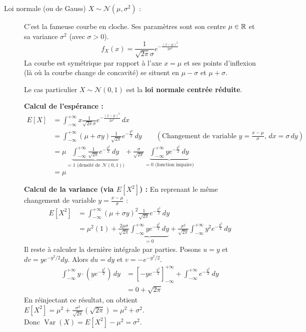 \begin{description}
    \item[Loi normale (ou de Gauss) $X \sim \mathcal{N}(\mu, \sigma^2)$ :]
    C'est la fameuse courbe en cloche. Ses paramètres sont son centre $\mu \in \mathbb{R}$ et sa variance $\sigma^2$ (avec $\sigma > 0$).
    \[
    f_X(x) = \frac{1}{\sqrt{2\pi}\sigma} e^{-\frac{(x-\mu)^2}{2\sigma^2}}
    \]
    La courbe est symétrique par rapport à l'axe $x = \mu$ et ses points d'inflexion (là où la courbe change de concavité) se situent en $\mu - \sigma$ et $\mu + \sigma$.
    
    Le cas particulier $X \sim \mathcal{N}(0, 1)$ est la \textbf{loi normale centrée réduite}.
    
    \textbf{Calcul de l'espérance :}
    \begin{align*}
        E[X] &= \int_{-\infty}^{+\infty} x \frac{1}{\sqrt{2\pi}\sigma} e^{-\frac{(x-\mu)^2}{2\sigma^2}} \, dx \\
        &= \int_{-\infty}^{+\infty} (\mu + \sigma y) \frac{1}{\sqrt{2\pi}} e^{-\frac{y^2}{2}} \, dy \qquad \left(\text{Changement de variable } y = \frac{x-\mu}{\sigma}, \, dx = \sigma \, dy\right) \\
        &= \mu \underbrace{\int_{-\infty}^{+\infty} \frac{1}{\sqrt{2\pi}} e^{-\frac{y^2}{2}} \, dy}_{=1 \text{ (densité de } \mathcal{N}(0,1))} + \frac{\sigma}{\sqrt{2\pi}} \underbrace{\int_{-\infty}^{+\infty} y e^{-\frac{y^2}{2}} \, dy}_{=0 \text{ (fonction impaire)}} \\
        &= \mu
    \end{align*}
    
    \textbf{Calcul de la variance (via $E[X^2]$) :}
    En reprenant le même changement de variable $y = \frac{x-\mu}{\sigma}$ :
    \begin{align*}
        E[X^2] &= \int_{-\infty}^{+\infty} (\mu + \sigma y)^2 \frac{1}{\sqrt{2\pi}} e^{-\frac{y^2}{2}} \, dy \\
        &= \mu^2 (1) + \frac{2\mu\sigma}{\sqrt{2\pi}} \underbrace{\int_{-\infty}^{+\infty} y e^{-\frac{y^2}{2}} \, dy}_{= 0} + \frac{\sigma^2}{\sqrt{2\pi}} \int_{-\infty}^{+\infty} y^2 e^{-\frac{y^2}{2}} \, dy
    \end{align*}
    Il reste à calculer la dernière intégrale par parties. Posons $u = y$ et $dv = y e^{-y^2/2}dy$. Alors $du = dy$ et $v = -e^{-y^2/2}$.
    \begin{align*}
        \int_{-\infty}^{+\infty} y \cdot \left( y e^{-\frac{y^2}{2}} \right) \, dy &= \left[ -y e^{-\frac{y^2}{2}} \right]_{-\infty}^{+\infty} + \int_{-\infty}^{+\infty} e^{-\frac{y^2}{2}} \, dy \\
        &= 0 + \sqrt{2\pi}
    \end{align*}
    En réinjectant ce résultat, on obtient $E[X^2] = \mu^2 + \frac{\sigma^2}{\sqrt{2\pi}} (\sqrt{2\pi}) = \mu^2 + \sigma^2$. \\
    Donc $\operatorname{Var}(X) = E[X^2] - \mu^2 = \sigma^2$.
\end{description}

